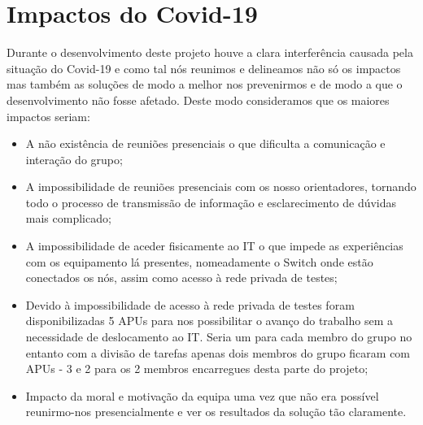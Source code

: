 \section{Impactos do Covid-19}
Durante o desenvolvimento deste projeto houve a clara interferência causada pela situação do Covid-19 e como tal nós reunimos e delineamos não só os impactos mas também as soluções de modo a melhor nos prevenirmos e de modo a que o desenvolvimento não fosse afetado.
Deste modo consideramos que os maiores impactos seriam:
\begin{itemize}
    \item A não existência de reuniões presenciais o que dificulta a comunicação e interação do grupo;
    \item A impossibilidade de reuniões presenciais com os nosso orientadores, tornando todo o processo de transmissão de informação e esclarecimento de dúvidas mais complicado;
    \item A impossibilidade de aceder fisicamente ao IT o que impede as experiências com os equipamento lá presentes, nomeadamente o Switch onde estão conectados os nós, assim como acesso à rede privada de testes;
    \item Devido à impossibilidade de acesso à rede privada de testes foram disponibilizadas 5 APUs para nos possibilitar o avanço do trabalho sem a necessidade de deslocamento ao IT. Seria um para cada membro do grupo no entanto com a divisão de tarefas apenas dois membros do grupo ficaram com APUs - 3 e 2 para os 2 membros encarregues desta parte do projeto;
    \item Impacto da moral e motivação da equipa uma vez que não era possível reunirmo-nos presencialmente e ver os resultados da solução tão claramente.
\end{itemize}

\break